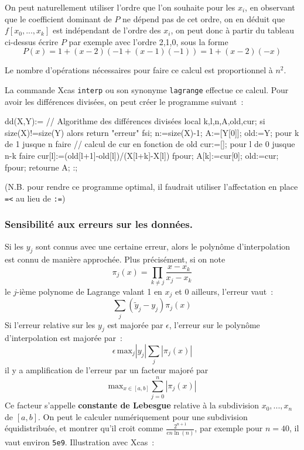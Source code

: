 \documentclass[a4paper,11pt]{article}
\begin{document}
\begin{giacjshere}
On peut naturellement utiliser l'ordre que l'on souhaite pour les
$x_i$, en observant que le coefficient dominant de $P$ ne d\'epend pas de
cet ordre, on en d\'eduit que $f[x_0,...,x_k]$ est ind\'ependant de
l'ordre des $x_i$, on peut donc \`a partir du tableau ci-dessus
\'ecrire $P$ par exemple avec l'ordre 2,1,0, sous la forme
\[ P(x)=1+(x-2)(-1+(x-1)(-1))=1+(x-2)(-x)\]

Le nombre d'op\'erations n\'ecessaires pour faire ce calcul est
proportionnel \`a $n^2$.

La commande Xcas \verb|interp| ou son synonyme \verb|lagrange|
effectue ce calcul. Pour avoir les diff\'erences divis\'ees, 
on peut cr\'eer le programme suivant~:
\begin{giacprog}
dd(X,Y):={ // Algorithme des différences divisées
  local k,l,n,A,old,cur;
  si size(X)!=size(Y) alors return "erreur" fsi;
  n:=size(X)-1;
  A:=[Y[0]];
  old:=Y;
  pour k de 1 jusque n faire
    // calcul de cur en fonction de old
    cur:=[];
    pour l de 0 jusque n-k faire
      cur[l]:=(old[l+1]-old[l])/(X[l+k]-X[l])
    fpour;
    A[k]:=cur[0];
    old:=cur;
  fpour;
  retourne A;
}:;
\end{giacprog}
(N.B. pour rendre ce programme optimal, il faudrait utiliser
l'affectation en place \verb|=<| au lieu de \verb|:=|)

\subsubsection{Sensibilit\'e aux erreurs sur les donn\'ees.}
Si les $y_j$ sont connus avec une certaine erreur, alors le polyn\^ome 
d'interpolation est connu de mani\`ere approch\'ee. Plus
pr\'ecis\'ement, si on note
$$ \pi_j(x)=\prod_{k \neq j} \frac{x-x_k}{x_j-x_k}$$
le $j$-i\`eme polynome de Lagrange valant 1 en $x_j$ et 0 ailleurs,
l'erreur vaut~:
$$ \sum_j (\tilde{y}_j-y_j) \pi_j(x) $$
Si l'erreur relative sur les $y_j$ est major\'ee par $\epsilon$,
l'erreur sur le polyn\^ome d'interpolation est major\'ee par~:
$$ \epsilon \, \mbox{max}_j|y_j| \sum_j |\pi_j(x)| $$
il y a amplification de l'erreur par un facteur major\'e par~
$$ \mbox{max}_{x \in [a,b]} \sum_{j=0}^n |\pi_j(x)| $$
Ce facteur s'appelle {\bf constante de Lebesgue} relative \`a la
subdivision $x_0,...,x_n$ de $[a,b]$. On peut le calculer
num\'eriquement pour une subdivision \'equidistribu\'ee,
et montrer qu'il croit comme $\frac{2^{n+1}}{e n \ln(n)}$,
par exemple pour $n=40$, il vaut environ {\tt 5e9}.
Illustration avec Xcas~:\\


\end{giacjshere}
\end{document}
